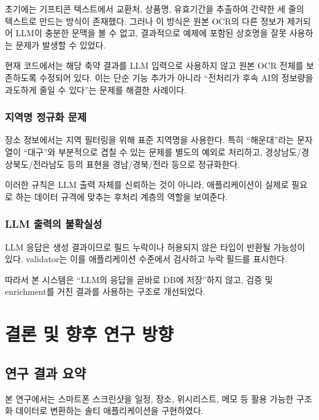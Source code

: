 \documentclass[11pt,a4paper]{article}
\begin{document}
초기에는 기프티콘 텍스트에서 교환처, 상품명, 유효기간을 추출하여 간략한 세 줄의 텍스트로 만드는 방식이 존재했다. 그러나 이 방식은 원본 OCR의 다른 정보가 제거되어 LLM이 충분한 문맥을 볼 수 없고, 결과적으로 예제에 포함된 상호명을 잘못 사용하는 문제가 발생할 수 있었다.

현재 코드에서는 해당 축약 결과를 LLM 입력으로 사용하지 않고 원본 OCR 전체를 보존하도록 수정되어 있다. 이는 단순 기능 추가가 아니라 ``전처리가 후속 AI의 정보량을 과도하게 줄일 수 있다''는 문제를 해결한 사례이다.

\subsubsection{지역명 정규화 문제}

장소 정보에서는 지역 필터링을 위해 표준 지역명을 사용한다. 특히 ``해운대''라는 문자열이 ``대구''와 부분적으로 겹칠 수 있는 문제를 별도의 예외로 처리하고, 경상남도/경상북도/전라남도 등의 표현을 경남/경북/전라 등으로 정규화한다.

이러한 규칙은 LLM 출력 자체를 신뢰하는 것이 아니라, 애플리케이션이 실제로 필요로 하는 데이터 규격에 맞추는 후처리 계층의 역할을 보여준다.

\subsubsection{LLM 출력의 불확실성}

LLM 응답은 생성 결과이므로 필드 누락이나 허용되지 않은 타입이 반환될 가능성이 있다. validator는 이를 애플리케이션 수준에서 검사하고 누락 필드를 표시한다.

따라서 본 시스템은 ``LLM의 응답을 곧바로 DB에 저장''하지 않고, 검증 및 enrichment를 거친 결과를 사용하는 구조로 개선되었다.

\newpage

\section{결론 및 향후 연구 방향}

\subsection{연구 결과 요약}

본 연구에서는 스마트폰 스크린샷을 일정, 장소, 위시리스트, 메모 등 활용 가능한 구조화 데이터로 변환하는 솔티 애플리케이션을 구현하였다.
\end{document}
